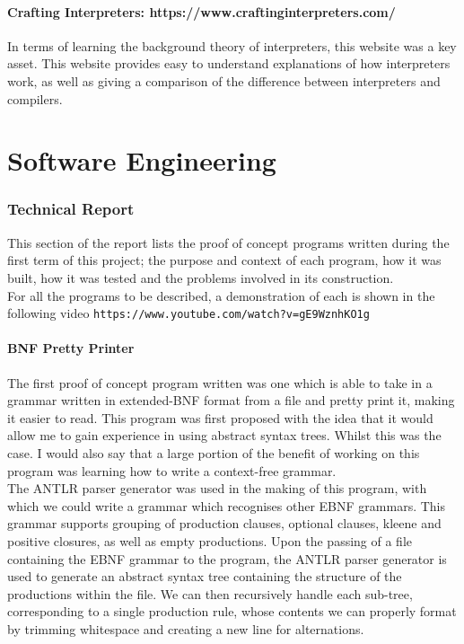\documentclass[a4paper, 11pt]{article}
\begin{document}
\subsection{Crafting Interpreters: https://www.craftinginterpreters.com/}
In terms of learning the background theory of interpreters, this website was a key asset. This website provides easy to understand explanations of how interpreters work, as well as giving a comparison of the difference between interpreters and compilers. 

\clearpage
\part{Software Engineering}
\setcounter{section}{0}

\section{Technical Report}
This section of the report lists the proof of concept programs written during the first term of this project; the purpose and context of each program, how it was built, how it was tested and the problems involved in its construction.
\\\newline
For all the programs to be described, a demonstration of each is shown in the following video \texttt{https://www.youtube.com/watch?v=gE9WznhKO1g}

\subsection{BNF Pretty Printer}
The first proof of concept program written was one which is able to take in a grammar written in extended-BNF format from a file and pretty print it, making it easier to read. This program was first proposed with the idea that it would allow me to gain experience in using abstract syntax trees. Whilst this was the case. I would also say that a large portion of the benefit of working on this program was learning how to write a context-free grammar.
\\\newline
The ANTLR parser generator was used in the making of this program, with which we could write a grammar which recognises other EBNF grammars. This grammar supports grouping of production clauses, optional clauses, kleene and positive closures, as well as empty productions. Upon the passing of a file containing the EBNF grammar to the program, the ANTLR parser generator is used to generate an abstract syntax tree containing the structure of the productions within the file. We can then recursively handle each sub-tree, corresponding to a single production rule, whose contents we can properly format by trimming whitespace and creating a new line for alternations.
\end{document}
